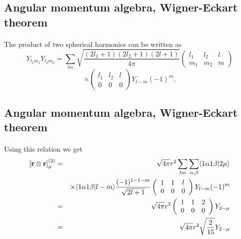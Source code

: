 \documentclass[%
twoside,                 %
final,                   %
10pt]{article}
\begin{document}
\subsection*{Angular momentum algebra, Wigner-Eckart theorem}

\paragraph{}
The product of two spherical harmonics can be written
as
\[
Y_{l_1m_1} Y_{l_2m_2}=\sum_{lm}\sqrt{\frac{(2l_1+1)(2l_2+1)(2l+1)}{4\pi}}
\left(\begin{array}{ccc} l_1&l_2&l \\ m_1&m_2&m\end{array}\right)
\]
\[
\times \left(\begin{array}{ccc} l_1&l_2&l \\ 0  &0  &0\end{array}\right)
Y_{l-m}(-1)^m.
\]


\subsection*{Angular momentum algebra, Wigner-Eckart theorem}

\paragraph{}
Using this relation we get  
\begin{eqnarray*}
\left[{\bf r} \otimes {\bf r} \right]^{(2)}_\mu &=& 
\sqrt{4\pi}r^2
\sum_{lm}
\sum_{\alpha ,\beta}   \langle 1\alpha 1\beta\vert 2\mu \rangle \\
&&\times \langle 1\alpha 1\beta\vert l-m \rangle
\frac{(-1)^{1-1-m}}{\sqrt{2l+1}} 
\left(\begin{array}{ccc} 1&1&l \\ 0  &0  &0\end{array}\right)Y_{l-m}(-1)^m\\
&=& \sqrt{4\pi}r^2
\left(\begin{array}{ccc} 1&1&2 \\ 0  &0  &0\end{array}\right)
Y_{2-\mu}\\
&=& \sqrt{4\pi}r^2 \sqrt{\frac{2}{15}}Y_{2-\mu}
\end{eqnarray*}
\end{document}
